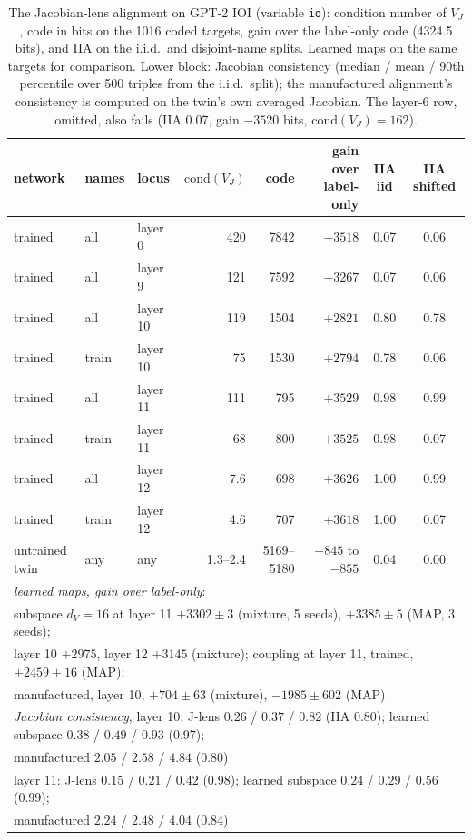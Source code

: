 \documentclass[11pt,a4paper]{article}
\newcommand{\dv}{d_V}
\begin{document}
\begin{table}[t]
\centering
\footnotesize
\caption{The Jacobian-lens alignment on GPT-2 IOI (variable \texttt{io}): condition number of $V_J$, code in bits on the 1016 coded targets, gain over the label-only code (4324.5 bits), and IIA on the i.i.d.\ and disjoint-name splits. Learned maps on the same targets for comparison. Lower block: Jacobian consistency (median / mean / 90th percentile over 500 triples from the i.i.d.\ split); the manufactured alignment's consistency is computed on the twin's own averaged Jacobian. The layer-6 row, omitted, also fails (IIA 0.07, gain $-3520$ bits, $\mathrm{cond}(V_J)=162$).}
\label{tab:jlens}
\begin{tabular}{lllrrrcc}
\toprule
network & names & locus & $\mathrm{cond}(V_J)$ & code & gain over label-only & IIA iid & IIA shifted \\
\midrule
trained & all & layer 0 & 420 & 7842 & $-3518$ & 0.07 & 0.06 \\
trained & all & layer 9 & 121 & 7592 & $-3267$ & 0.07 & 0.06 \\
trained & all & layer 10 & 119 & 1504 & $+2821$ & 0.80 & 0.78 \\
trained & train & layer 10 & 75 & 1530 & $+2794$ & 0.78 & 0.06 \\
trained & all & layer 11 & 111 & 795 & $+3529$ & 0.98 & 0.99 \\
trained & train & layer 11 & 68 & 800 & $+3525$ & 0.98 & 0.07 \\
trained & all & layer 12 & 7.6 & 698 & $+3626$ & 1.00 & 0.99 \\
trained & train & layer 12 & 4.6 & 707 & $+3618$ & 1.00 & 0.07 \\
untrained twin & any & any & 1.3--2.4 & 5169--5180 & $-845$ to $-855$ & 0.04 & 0.00 \\
\midrule
\multicolumn{8}{l}{\emph{learned maps, gain over label-only}:}\\
\multicolumn{8}{l}{\quad subspace $\dv=16$ at layer 11 $+3302\pm3$ (mixture, 5 seeds), $+3385\pm5$ (MAP, 3 seeds);}\\
\multicolumn{8}{l}{\quad layer 10 $+2975$, layer 12 $+3145$ (mixture); coupling at layer 11, trained, $+2459\pm16$ (MAP);}\\
\multicolumn{8}{l}{\quad manufactured, layer 10, $+704\pm63$ (mixture), $-1985\pm602$ (MAP)}\\
\midrule
\multicolumn{8}{l}{\emph{Jacobian consistency}, layer 10: J-lens $0.26$ / $0.37$ / $0.82$ (IIA 0.80); learned subspace $0.38$ / $0.49$ / $0.93$ (0.97);}\\
\multicolumn{8}{l}{\quad manufactured $2.05$ / $2.58$ / $4.84$ (0.80)}\\
\multicolumn{8}{l}{layer 11: J-lens $0.15$ / $0.21$ / $0.42$ (0.98); learned subspace $0.24$ / $0.29$ / $0.56$ (0.99);}\\
\multicolumn{8}{l}{\quad manufactured $2.24$ / $2.48$ / $4.04$ (0.84)}\\
\bottomrule
\end{tabular}
\end{table}
\end{document}
